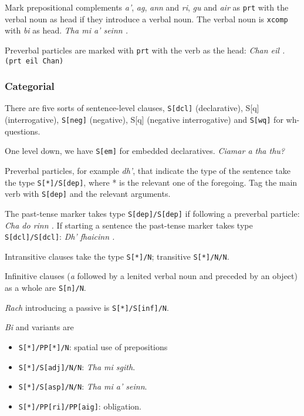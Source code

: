 \documentclass[a4paper]{article}
\begin{document}
 Mark prepositional complements \textit{a'}, \textit{ag}, \textit{ann} and \textit{ri}, \textit{gu} and \textit{air} as \texttt{prt} with the verbal noun as head if they introduce a verbal noun. The verbal noun is \texttt{xcomp} with \textit{bi} as head. \textit{Tha mi a' seinn .}

 Preverbal particles are marked with \texttt{prt} with the verb as the head: \textit{Chan eil .} \texttt{(prt eil Chan)} 

\subsubsection{Categorial}
 There are five sorts of sentence-level clauses, \texttt{S[dcl]} (declarative), S[q] (interrogative), \texttt{S[neg]} (negative), S[q] (negative interrogative) and \texttt{S[wq]} for wh-questions.

 One level down, we have \texttt{S[em]} for embedded declaratives. \textit{Ciamar a tha thu?}

 Preverbal particles, for example \textit{dh'}, that indicate the type of the sentence take the type \texttt{S[*]/S[dep]}, where * is the relevant one of the foregoing. Tag the main verb with \texttt{S[dep]} and the relevant arguments.

 The past-tense marker takes type \texttt{S[dep]/S[dep]} if following a preverbal particle: \textit{Cha do rinn .}
If starting a sentence the past-tense marker takes type \texttt{S[dcl]/S[dcl]}: \textit{Dh' fhaicinn .}

 Intransitive clauses take the type \texttt{S[*]/N}; transitive \texttt{S[*]/N/N}.

 Infinitive clauses (\textit{a} followed by a lenited verbal noun and preceded by an object) as a whole are \texttt{S[n]/N}.

 \textit{Rach} introducing a passive is \texttt{S[*]/S[inf]/N}.

 \textit{Bi} and variants are \begin{itemize}
\item \texttt{S[*]/PP[*]/N}: spatial use of prepositions 
\item \texttt{S[*]/S[adj]/N/N}: \textit{Tha mi sgith}.
\item \texttt{S[*]/S[asp]/N/N}: \textit{Tha mi a' seinn}.
\item \texttt{S[*]/PP[ri]/PP[aig]}: obligation.
\end{itemize}
\end{document}
